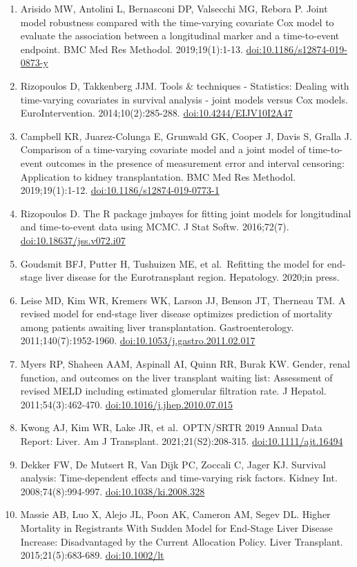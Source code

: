 \documentclass[11pt,english,]{book} %
\begin{document}
\begin{enumerate}
\item
  Arisido MW, Antolini L, Bernasconi DP, Valsecchi MG, Rebora P. Joint model robustness compared with the time-varying covariate Cox model to evaluate the association between a longitudinal marker and a time-to-event endpoint. BMC Med Res Methodol. 2019;19(1):1-13. \url{doi:10.1186/s12874-019-0873-y}
\item
  Rizopoulos D, Takkenberg JJM. Tools \& techniques - Statistics: Dealing with time-varying covariates in survival analysis - joint models versus Cox models. EuroIntervention. 2014;10(2):285-288. \url{doi:10.4244/EIJV10I2A47}
\item
  Campbell KR, Juarez-Colunga E, Grunwald GK, Cooper J, Davis S, Gralla J. Comparison of a time-varying covariate model and a joint model of time-to-event outcomes in the presence of measurement error and interval censoring: Application to kidney transplantation. BMC Med Res Methodol. 2019;19(1):1-12. \url{doi:10.1186/s12874-019-0773-1}
\item
  Rizopoulos D. The R package jmbayes for fitting joint models for longitudinal and time-to-event data using MCMC. J Stat Softw. 2016;72(7). \url{doi:10.18637/jss.v072.i07}
\item
  Goudsmit BFJ, Putter H, Tushuizen ME, et al.~Refitting the model for end-stage liver disease for the Eurotransplant region. Hepatology. 2020;in press.
\item
  Leise MD, Kim WR, Kremers WK, Larson JJ, Benson JT, Therneau TM. A revised model for end-stage liver disease optimizes prediction of mortality among patients awaiting liver transplantation. Gastroenterology. 2011;140(7):1952-1960. \url{doi:10.1053/j.gastro.2011.02.017}
\item
  Myers RP, Shaheen AAM, Aspinall AI, Quinn RR, Burak KW. Gender, renal function, and outcomes on the liver transplant waiting list: Assessment of revised MELD including estimated glomerular filtration rate. J Hepatol. 2011;54(3):462-470. \url{doi:10.1016/j.jhep.2010.07.015}
\item
  Kwong AJ, Kim WR, Lake JR, et al.~OPTN/SRTR 2019 Annual Data Report: Liver. Am J Transplant. 2021;21(S2):208-315. \url{doi:10.1111/ajt.16494}
\item
  Dekker FW, De Mutsert R, Van Dijk PC, Zoccali C, Jager KJ. Survival analysis: Time-dependent effects and time-varying risk factors. Kidney Int. 2008;74(8):994-997. \url{doi:10.1038/ki.2008.328}
\item
  Massie AB, Luo X, Alejo JL, Poon AK, Cameron AM, Segev DL. Higher Mortality in Registrants With Sudden Model for End-Stage Liver Disease Increase: Disadvantaged by the Current Allocation Policy. Liver Transplant. 2015;21(5):683-689. \url{doi:10.1002/lt}

\end{enumerate}
\end{document}
